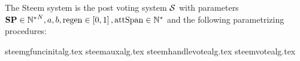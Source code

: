 \begin{definition}
  The Steem system is the post voting system $\mathcal{S}$ with parameters $\mathrm{\textbf{SP}}
  \in {\mathbb{N}^*}^N, a, b, \mathrm{regen} \in \left[0, 1\right],
  \mathrm{attSpan} \in \mathbb{N}^*$ and the following parametrizing procedures:
\end{definition}
{steemgfuncinitalg.tex}
{steemauxalg.tex}
{steemhandlevotealg.tex}
{steemvotealg.tex}
